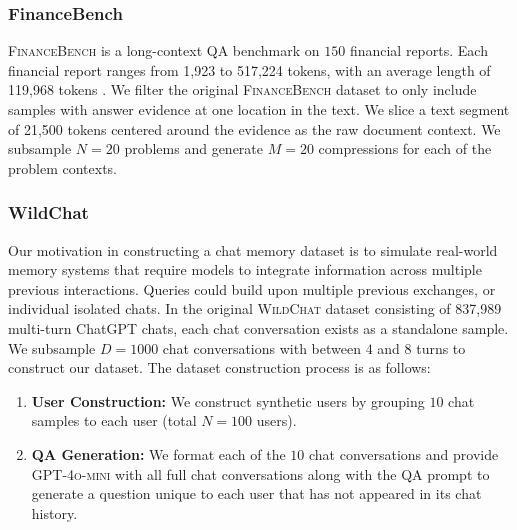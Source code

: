 \documentclass{article} %
\begin{document}
\subsubsection{FinanceBench}
\label{sec:appendix-financebench}
\textsc{FinanceBench} is a long-context QA benchmark on $150$ financial reports. Each financial report ranges from 1{,}923 to 517{,}224 tokens, with an average length of 119{,}968 tokens \citep{islam2023financebench}. We filter the original \textsc{FinanceBench} dataset to only include samples with answer evidence at one location in the text. We slice a text segment of 21{,}500 tokens centered around the evidence as the raw document context. We subsample $N=20$ problems and generate $M=20$ compressions for each of the problem contexts.

\subsubsection{WildChat}
\label{sec:appendix-wildchat} 

Our motivation in constructing a chat memory dataset is to simulate real-world memory systems that require models to integrate information across multiple previous interactions. Queries could build upon multiple previous exchanges, or individual isolated chats. In the original \textsc{WildChat} dataset consisting of 837{,}989 multi-turn ChatGPT chats, each chat conversation exists as a standalone sample. We subsample $D=1000$ chat conversations with between $4$ and $8$ turns to construct our dataset. The dataset construction process is as follows:
\begin{enumerate}[leftmargin=*]
    \item \textbf{User Construction:} We construct synthetic users by grouping $10$ chat samples to each user (total $N=100$ users).
    \item \textbf{QA Generation:} We format each of the $10$ chat conversations and provide \textsc{GPT-4o-mini} with all full chat conversations along with the QA prompt to generate a question unique to each user that has not appeared in its chat history. 
\end{enumerate}
\end{document}
